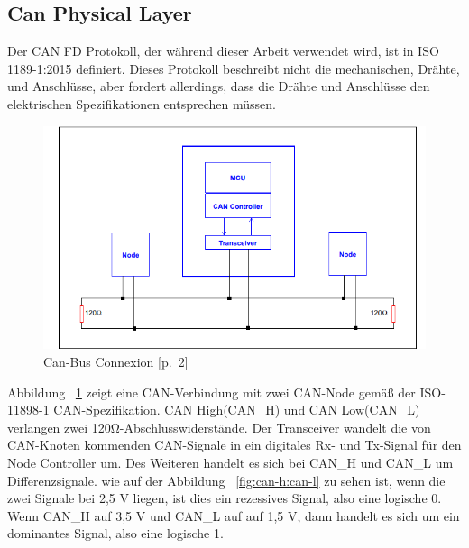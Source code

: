 \subsection{Can Physical Layer}
\label{subsec:can_bus_controller:can_physical_layer}
Der CAN FD Protokoll, der während dieser Arbeit verwendet wird, ist in ISO 1189-1:2015 definiert. Dieses Protokoll beschreibt nicht die mechanischen, Drähte, und Anschlüsse, aber fordert allerdings, dass die Drähte und Anschlüsse den elektrischen Spezifikationen entsprechen müssen. 
\begin{figure}[h]
	\begin{center}
		\includegraphics[width=1\textwidth]{./images/Can-connexion.jpg}
	\end{center}
	\vspace{-5pt}
	\caption[Can-Bus Connexion]{Can-Bus Connexion \cite{Richards2002}[p.~2]} %
	\label{fig:can-bus-connexion}
	\vspace{-5pt}
\end{figure}
Abbildung ~\ref{fig:can-bus-connexion} zeigt eine CAN-Verbindung mit zwei CAN-Node gemäß der ISO-11898-1 CAN-Spezifikation. CAN High(CAN_H) und CAN Low(CAN_L) verlangen zwei 120\si{\ohm}-Abschlusswiderstände. Der Transceiver wandelt die von CAN-Knoten kommenden CAN-Signale in ein digitales Rx- und Tx-Signal für den Node Controller um.
Des Weiteren handelt es sich bei CAN_H und CAN_L um Differenzsignale. wie auf der Abbildung  ~\ref{fig:can-h:can-l}  zu sehen ist, wenn die zwei Signale bei 2,5 V liegen, ist dies ein rezessives Signal, also eine logische 0. Wenn CAN_H auf 3,5 V und CAN_L auf auf 1,5 V, dann handelt es sich um ein dominantes Signal, also eine logische 1. 
